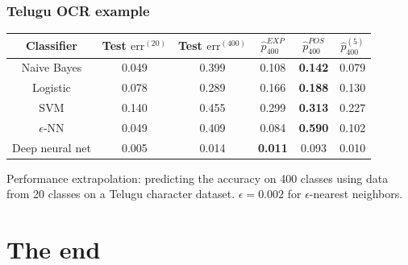 \documentclass{beamer}
\begin{document}
\begin{frame}
\frametitle{Telugu OCR example}
\begin{center}
\begin{tabular}{|c||c|c|c|c|c|}\hline
Classifier      & Test $\text{err}^{(20)}$ & Test $\text{err}^{(400)}$ & $\hat{p}^{EXP}_{400}$ & $\hat{p}^{POS}_{400}$ & $\hat{p}^{(5)}_{400}$\\ \hline
Naive Bayes     & 0.049                   & 0.399                   & 0.108              & \textbf{0.142}      & 0.079             \\ \hline
Logistic        & 0.078                   & 0.289                   & 0.166              & \textbf{0.188}      & 0.130             \\ \hline
SVM             & 0.140                   & 0.455                   & 0.299              & \textbf{0.313}      & 0.227             \\ \hline
$\epsilon$-NN   & 0.049                   & 0.409                   & 0.084              & \textbf{0.590}      & 0.102             \\ \hline
Deep neural net & 0.005                   & 0.014                   & \textbf{0.011}     & 0.093               & 0.010             \\ \hline
\end{tabular}

Performance extrapolation: predicting the accuracy on 400 classes using data from 20 classes on a Telugu character dataset.
$\epsilon = 0.002$ for $\epsilon$-nearest neighbors.
\end{center}
\end{frame}

\section*{The end}

\begin{frame}
\sectionpage
\end{frame}
\end{document}
